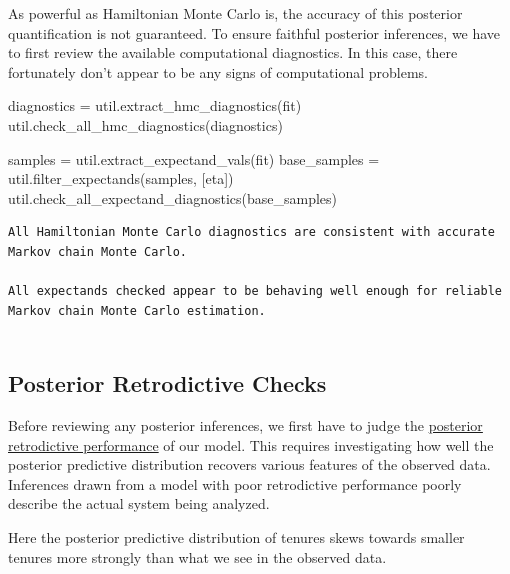 \documentclass[
  letterpaper,
  DIV=11,
  numbers=noendperiod]{scrartcl}
\newenvironment{Shaded}{\begin{snugshade}}{\end{snugshade}}
\newcommand{\NormalTok}[1]{\textcolor[rgb]{0.00,0.23,0.31}{#1}}
\newcommand{\OperatorTok}[1]{\textcolor[rgb]{0.37,0.37,0.37}{#1}}
\newcommand{\StringTok}[1]{\textcolor[rgb]{0.13,0.47,0.30}{#1}}
\begin{document}
As powerful as Hamiltonian Monte Carlo is, the accuracy of this
posterior quantification is not guaranteed. To ensure faithful posterior
inferences, we have to first review the available computational
diagnostics. In this case, there fortunately don't appear to be any
signs of computational problems.

\begin{Shaded}
\begin{Highlighting}[]
\NormalTok{diagnostics }\OperatorTok{=}\NormalTok{ util.extract\_hmc\_diagnostics(fit)}
\NormalTok{util.check\_all\_hmc\_diagnostics(diagnostics)}

\NormalTok{samples }\OperatorTok{=}\NormalTok{ util.extract\_expectand\_vals(fit)}
\NormalTok{base\_samples }\OperatorTok{=}\NormalTok{ util.filter\_expectands(samples, [}\StringTok{\textquotesingle{}eta\textquotesingle{}}\NormalTok{])}
\NormalTok{util.check\_all\_expectand\_diagnostics(base\_samples)}
\end{Highlighting}
\end{Shaded}

\begin{verbatim}
All Hamiltonian Monte Carlo diagnostics are consistent with accurate
Markov chain Monte Carlo.
 
All expectands checked appear to be behaving well enough for reliable
Markov chain Monte Carlo estimation.
 
\end{verbatim}

\subsection{Posterior Retrodictive
Checks}\label{posterior-retrodictive-checks}

Before reviewing any posterior inferences, we first have to judge the
\href{http://www.symplectomorphic.com/assets/case_studies/principled_bayesian_workflow.html\#143_Posterior_Retrodiction_Checks}{posterior
retrodictive performance} of our model. This requires investigating how
well the posterior predictive distribution recovers various features of
the observed data. Inferences drawn from a model with poor retrodictive
performance poorly describe the actual system being analyzed.

Here the posterior predictive distribution of tenures skews towards
smaller tenures more strongly than what we see in the observed data.
\end{document}
